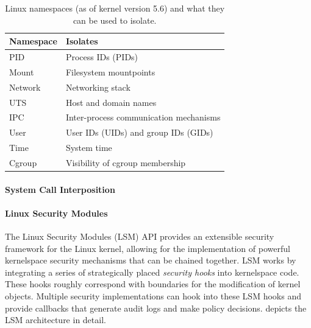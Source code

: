 \begin{table}
\begin{tabular}{lp{3in}}
    \toprule
    Namespace & Isolates \\
    \midrule
    \multirow{1}{*}{PID} & Process IDs (PIDs)\\
    \multirow{1}{*}{Mount} & Filesystem mountpoints\\
    \multirow{1}{*}{Network} & Networking stack\\
    \multirow{1}{*}{UTS} & Host and domain names\\
    \multirow{1}{*}{IPC} & Inter-process communication mechanisms\\
    \multirow{1}{*}{User} & User IDs (UIDs) and group IDs (GIDs)\\
    \multirow{1}{*}{Time} & System time\\
    \multirow{1}{*}{Cgroup} & Visibility of cgroup membership\\
    \bottomrule
\end{tabular}
\caption{Linux namespaces (as of kernel version 5.6) and what they can be used to isolate.}
\label{tab:namespaces}
\end{table}

\paragraph*{System Call Interposition}

\paragraph*{Linux Security Modules}

The Linux Security Modules (LSM) API \cite{wright2002_lsm} provides an extensible security framework for the Linux kernel, allowing for the implementation of powerful kernelspace security mechanisms that can be chained together. LSM works by integrating a series of strategically placed \textit{security hooks} into kernelspace code. These hooks roughly correspond with boundaries for the modification of kernel objects. Multiple security implementations can hook into these LSM hooks and provide callbacks that generate audit logs and make policy decisions.  depicts the LSM architecture in detail.

